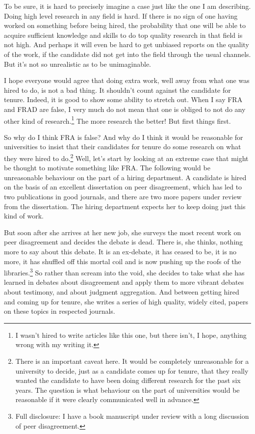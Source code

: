 To be sure, it is hard to precisely imagine a case just like the one I am describing. Doing high level research in any field is hard. If there is no sign of one having worked on something before being hired, the probability that one will be able to acquire sufficient knowledge and skills to do top quality research in that field is not high. And perhaps it will even be hard to get unbiased reports on the quality of the work, if the candidate did not get into the field through the usual channels. But it's not so unrealistic as to be unimaginable.

I hope everyone would agree that doing extra work, well away from what one was hired to do, is not a bad thing. It shouldn't count against the candidate for tenure. Indeed, it is good to show some ability to stretch out. When I say FRA and FRAD are false, I very much do not mean that one is obliged to not do any other kind of research.\footnote{I wasn't hired to write articles like this one, but there isn't, I hope, anything wrong with my writing it.} The more research the better! But first things first.

So why do I think FRA is false? And why do I think it would be reasonable for universities to insist that their candidates for tenure do some research on what they were hired to do.\footnote{There is an important caveat here. It would be completely unreasonable for a university to decide, just as a candidate comes up for tenure, that they really wanted the candidate to have been doing different research for the past six years. The question is what behaviour on the part of universities would be reasonable if it were clearly communicated well in advance.} Well, let's start by looking at an extreme case that might be thought to motivate something like FRA. The following would be unreasonable behaviour on the part of a hiring department. A candidate is hired on the basis of an excellent dissertation on peer disagreement, which has led to two publications in good journals, and there are two more papers under review from the dissertation. The hiring department expects her to keep doing just this kind of work. 

But soon after she arrives at her new job, she surveys the most recent work on peer disagreement and decides the debate is dead. There is, she thinks, nothing more to say about this debate. It is an ex-debate, it has ceased to be, it is no more, it has shuffled off this mortal coil and is now pushing up the roofs of the libraries.\footnote{Full disclosure: I have a book manuscript under review with a long discussion of peer disagreement.} So rather than scream into the void, she decides to take what she has learned in debates about disagreement and apply them to more vibrant debates about testimony, and about judgment aggregation. And between getting hired and coming up for tenure, she writes a series of high quality, widely cited, papers on these topics in respected journals.

